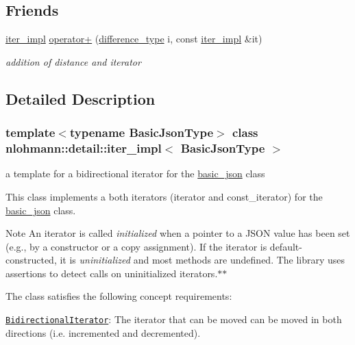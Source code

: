 \subsection*{Friends}
\begin{DoxyCompactItemize}
\item 
\hyperlink{classnlohmann_1_1detail_1_1iter__impl}{iter\+\_\+impl} \hyperlink{classnlohmann_1_1detail_1_1iter__impl_a94108d1a7563e103534f23eb5c1ee175}{operator+} (\hyperlink{classnlohmann_1_1detail_1_1iter__impl_a2f7ea9f7022850809c60fc3263775840}{difference\+\_\+type} i, const \hyperlink{classnlohmann_1_1detail_1_1iter__impl}{iter\+\_\+impl} \&it)
\begin{DoxyCompactList}\small\item\em addition of distance and iterator \end{DoxyCompactList}\end{DoxyCompactItemize}


\subsection{Detailed Description}
\subsubsection*{template$<$typename Basic\+Json\+Type$>$\newline
class nlohmann\+::detail\+::iter\+\_\+impl$<$ Basic\+Json\+Type $>$}

a template for a bidirectional iterator for the \hyperlink{classnlohmann_1_1basic__json}{basic\+\_\+json} class 

This class implements a both iterators (iterator and const\+\_\+iterator) for the \hyperlink{classnlohmann_1_1basic__json}{basic\+\_\+json} class.

\begin{DoxyNote}{Note}
An iterator is called {\itshape initialized} when a pointer to a J\+S\+ON value has been set (e.\+g., by a constructor or a copy assignment). If the iterator is default-\/constructed, it is {\itshape uninitialized} and most methods are undefined. The library uses assertions to detect calls on uninitialized iterators.$\ast$$\ast$
\end{DoxyNote}
The class satisfies the following concept requirements\+:
\begin{DoxyItemize}
\item \href{http://en.cppreference.com/w/cpp/concept/BidirectionalIterator}{\tt Bidirectional\+Iterator}\+: The iterator that can be moved can be moved in both directions (i.\+e. incremented and decremented).
\end{DoxyItemize}

